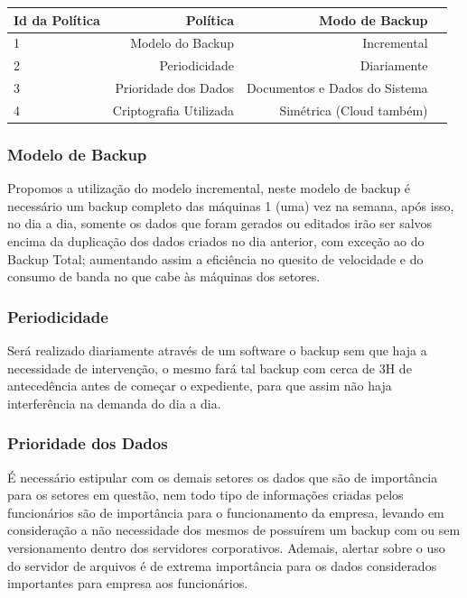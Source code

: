 \documentclass[12pt]{article}
\begin{document}
\begin{center}
\begin{tabular}{| l | r | r | r |}
\hline 
Id da Política & Política & Modo de Backup\\
\hline
1 & Modelo do Backup & Incremental\\
2 & Periodicidade & Diariamente\\
3 & Prioridade dos Dados & Documentos e Dados do Sistema\\
4 & Criptografia Utilizada & Simétrica (Cloud também)\\
\hline
\end{tabular}
\end{center}

\subsubsection{Modelo de Backup}
Propomos a utilização do modelo incremental, neste modelo de backup é necessário um backup completo das máquinas 1 (uma) vez na semana, após isso, no dia a dia, somente os dados que foram gerados ou editados irão ser salvos encima da duplicação dos dados criados no dia anterior, com exceção ao do Backup Total; aumentando assim a eficiência no quesito de velocidade e do consumo de banda no que cabe às máquinas dos setores.

\subsubsection{Periodicidade}
Será realizado diariamente através de um software o backup sem que haja a necessidade de intervenção, o mesmo fará tal backup com cerca de 3H de antecedência antes de começar o expediente, para que assim não haja interferência na demanda do dia a dia. 

\subsubsection{Prioridade dos Dados}
É necessário estipular com os demais setores os dados que são de importância para os setores em questão, nem todo tipo de informações criadas pelos funcionários são de importância para o funcionamento da empresa, levando em consideração a não necessidade dos mesmos de possuírem um backup com ou sem versionamento dentro dos servidores corporativos. Ademais, alertar sobre o uso do servidor de arquivos é de extrema importância para os dados considerados importantes para empresa aos funcionários.
\end{document}
